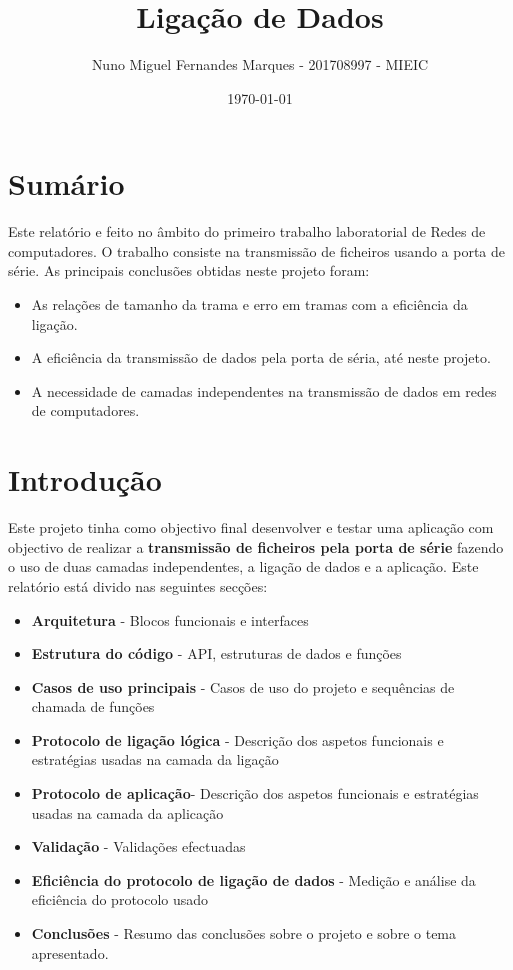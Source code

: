 \documentclass[11pt]{article}
\title{\large{\textbf{Ligação de Dados}} }
\author{Nuno Miguel Fernandes Marques - 201708997 - MIEIC}
\date{\today}
\begin{document}
\maketitle
\thispagestyle{empty}

\newpage
\thispagestyle{fancy}
\fancyhf{}
\fancyfoot[R]{\thepage}
\renewcommand*{\footrulewidth}{1pt}

\section*{Sumário}
Este relatório e feito no âmbito do primeiro trabalho laboratorial de Redes de computadores. O trabalho consiste na transmissão de ficheiros usando a porta de série. As principais conclusões obtidas neste projeto foram:
\begin{itemize}
    \item As relações de tamanho da trama e erro em tramas com a eficiência da ligação.
    \item A eficiência da transmissão de dados pela porta de séria, até  neste projeto.
    \item A necessidade de camadas independentes na transmissão de dados em redes de computadores.
\end{itemize}
  

\section*{Introdução}
Este projeto tinha como objectivo final desenvolver e testar uma aplicação com objectivo de realizar a \textbf{transmissão de ficheiros pela porta de série} fazendo o uso de duas camadas independentes, a ligação de dados e a aplicação.
Este relatório está divido nas seguintes secções:
\begin{itemize}
    \item \textbf{Arquitetura} - Blocos funcionais e interfaces
    \item \textbf{Estrutura do código} - API, estruturas de dados e funções
    \item \textbf{Casos de uso principais} - Casos de uso do projeto e sequências de chamada de funções
    \item \textbf{Protocolo de ligação lógica} - Descrição dos aspetos funcionais e estratégias usadas na camada da ligação
    \item \textbf{Protocolo de aplicação}- Descrição dos aspetos funcionais e estratégias usadas na camada da aplicação
    \item \textbf{Validação} - Validações efectuadas
    \item \textbf{Eficiência do protocolo de ligação de dados} - Medição e análise da eficiência do protocolo usado
    \item \textbf{Conclusões} - Resumo das conclusões sobre o projeto e sobre o tema apresentado.
\end{itemize}
\end{document}
